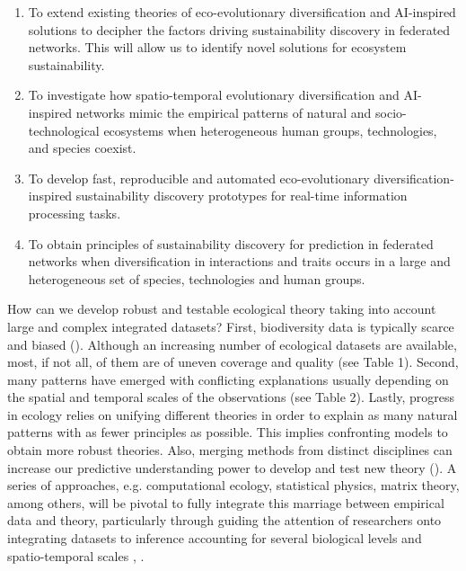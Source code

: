 \documentclass[12pt,a4paper]{article}
\begin{document}
\begin{enumerate}%
    \item To extend existing theories of eco-evolutionary diversification and AI-inspired solutions to decipher the factors driving sustainability discovery in federated networks. This will allow us to identify novel solutions for ecosystem sustainability.
    \item To investigate how spatio-temporal evolutionary diversification and AI-inspired networks mimic the empirical patterns of natural and socio-technological ecosystems when heterogeneous human groups, technologies, and species coexist.
    \item To develop fast, reproducible and automated eco-evolutionary diversification-inspired sustainability discovery prototypes for real-time information processing tasks.
    \item To obtain principles of sustainability discovery for prediction in federated networks when diversification in interactions and traits occurs in a large and heterogeneous set of species, technologies and human groups. 
\end{enumerate}

How can we develop robust and testable ecological theory taking into
account large and complex integrated datasets? First, biodiversity
data is typically scarce and biased (\citep{hortal2015seven}). Although an increasing number of ecological
datasets are available, most, if not all, of them are of uneven
coverage and quality (see Table 1). Second, many patterns have emerged
with conflicting explanations usually depending on the spatial and
temporal scales of the observations (see Table 2). Lastly, progress in
ecology relies on unifying different theories in order to explain as
many natural patterns with as fewer principles as possible. This
implies confronting models to obtain more robust theories. Also,
merging methods from distinct disciplines can increase our predictive 
understanding power to develop and test new theory (\citep{reichstein2019deep}). A series of approaches,
e.g. computational ecology, statistical physics, matrix theory, among
others, will be pivotal to fully integrate this marriage between empirical data and theory, particularly through guiding the attention of researchers onto integrating datasets to inference accounting for several biological levels and spatio-temporal scales \citep{melian2018deciphering}, \citep{poisot2019data}.
\end{document}
